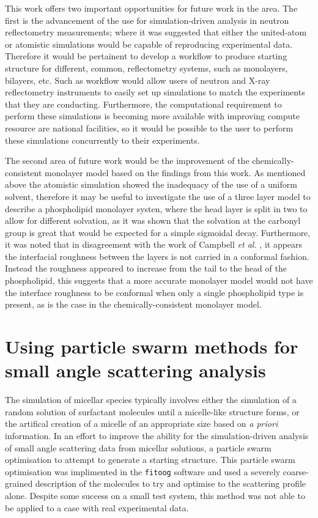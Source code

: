 This work offers two important opportunities for future work in the area.
The first is the advancement of the use for simulation-driven analysis in neutron reflectometry measurements; where it was suggested that either the united-atom or atomistic simulations would be capable of reproducing experimental data.
Therefore it would be pertainent to develop a workflow to produce starting structure for different, common, reflectometry systems, such as monolayers, bilayers, etc.
Such as workflow would allow users of neutron and X-ray reflectometry instruments to easily set up simulations to match the experiments that they are conducting.
Furthermore, the computational requirement to perform these simulations is becoming more available with improving compute resource are national facilities, so it would be possible to the user to perform these simulations concurrently to their experiments.

The second area of future work would be the improvement of the chemically-consistent monolayer model based on the findings from this work.
As mentioned above the atomistic simulation showed the inadequacy of the use of a uniform solvent, therefore it may be useful to investigate the use of a three layer model to describe a phospholipid monolayer systen, where the head layer is split in two to allow for different solvation, as it was shown that the solvation at the carbonyl group is great that would be expected for a simple sigmoidal decay.
Furthermore, it was noted that in disagreement with the work of Campbell \emph{et al.} \cite{campbell_structure_2018}, it appears the interfacial roughness between the layers is not carried in a conformal fashion.
Instead the roughness appeared to increase from the tail to the head of the phospholipid, this suggests that a more accurate monolayer model would not have the interface roughness to be conformal when only a single phospholipid type is present, as is the case in the chemically-consistent monolayer model.

\section{Using particle swarm methods for small angle scattering analysis}
The simulation of micellar species typically involves either the simulation of a random solution of surfactant molecules until a micelle-like structure forms, or the artifical creation of a micelle of an appropriate size based on \emph{a priori} information.
In an effort to improve the ability for the simulation-driven analysis of small angle scattering data from micellar solutions, a particle swarm optimisation to attempt to generate a starting structure.
This particle swarm optimisation was implimented in the \texttt{fitoog} software and used a severely coarse-grained description of the molecules to try and optimise to the scattering profile alone.
Despite some success on a small test system, this method was not able to be applied to a case with real experimental data.

